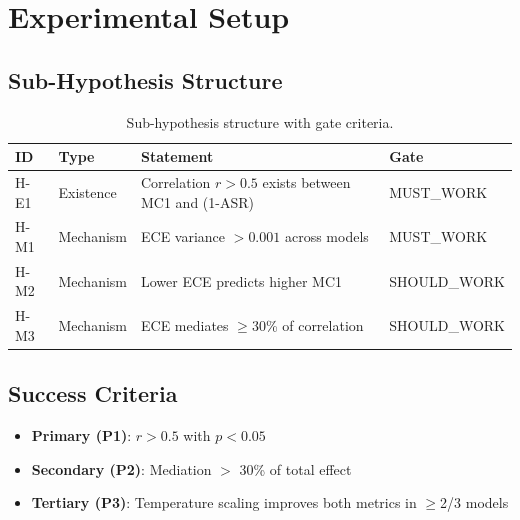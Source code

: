 \section{Experimental Setup}

\subsection{Sub-Hypothesis Structure}

\begin{table}[h]
\centering
\caption{Sub-hypothesis structure with gate criteria.}
\label{tab:hypotheses}
\begin{tabular}{llll}
\toprule
ID & Type & Statement & Gate \\
\midrule
H-E1 & Existence & Correlation $r > 0.5$ exists between MC1 and (1-ASR) & MUST\_WORK \\
H-M1 & Mechanism & ECE variance $> 0.001$ across models & MUST\_WORK \\
H-M2 & Mechanism & Lower ECE predicts higher MC1 & SHOULD\_WORK \\
H-M3 & Mechanism & ECE mediates $\geq$30\% of correlation & SHOULD\_WORK \\
\bottomrule
\end{tabular}
\end{table}

\subsection{Success Criteria}

\begin{itemize}
    \item \textbf{Primary (P1)}: $r > 0.5$ with $p < 0.05$
    \item \textbf{Secondary (P2)}: Mediation $>$ 30\% of total effect
    \item \textbf{Tertiary (P3)}: Temperature scaling improves both metrics in $\geq$2/3 models
\end{itemize}
